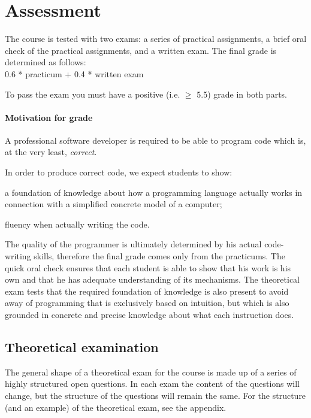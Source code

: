 \section{Assessment}
	The course is tested with two exams: a series of practical assignments, a brief oral check of the practical assignments, and a written exam. The final grade is determined as follows: \\

	0.6 * practicum + 0.4 * written exam

	To pass the exam you must have a positive (i.e. $\geq$ 5.5) grade in both parts.

	\paragraph*{Motivation for grade}
		A professional software developer is required to be able to program code which is, at the very least, \textit{correct}.

		In order to produce correct code, we expect students to show:
		\begin{inparaenum}
			\item a foundation of knowledge about how a programming language actually works in connection with a simplified concrete model of a computer;
			\item fluency when actually writing the code.
		\end{inparaenum}

		The quality of the programmer is ultimately determined by his actual code-writing skills, therefore the final grade comes only from the practicums. The quick oral check ensures that each student is able to show that his work is his own and that he has adequate understanding of its mechanisms. The theoretical exam tests that the required foundation of knowledge is also present to avoid away of programming that is exclusively based on intuition, but which is also grounded in concrete and precise knowledge about what each instruction does.


	\subsection{Theoretical examination}
		The general shape of a theoretical exam for the course is made up of a series of highly structured open questions. In each exam the content of the questions will change, but the structure of the questions will remain the same. For the structure (and an example) of the theoretical exam, see the appendix.


